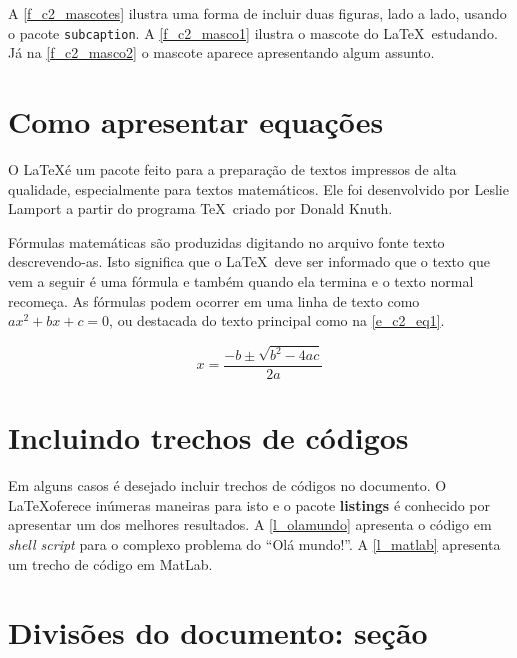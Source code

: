 A \autoref{f_c2_mascotes} ilustra uma forma de incluir duas figuras, lado a lado, usando o pacote \texttt{subcaption}. A \autoref{f_c2_masco1} ilustra o mascote do \LaTeX~estudando. Já na \autoref{f_c2_masco2} o mascote aparece apresentando algum assunto. 


\section{Como apresentar equações}
\label{s_c2_equacoes}

O \LaTeX é um pacote feito para a preparação de textos impressos de alta qualidade, especialmente
para textos matemáticos. Ele foi desenvolvido por Leslie Lamport a partir do programa
\TeX~criado por Donald Knuth.

Fórmulas matemáticas são produzidas digitando no arquivo fonte texto descrevendo-as. Isto
significa que o \LaTeX~deve ser informado que o texto que vem a seguir é uma fórmula e também
quando ela termina e o texto normal recomeça. As fórmulas podem ocorrer em uma linha de
texto como $ax^2 + bx + c = 0$, ou destacada do texto principal como na \autoref{e_c2_eq1}.

\begin{equation}
 x=\frac{-b\pm\sqrt{b^2-4ac}}{2a}
\label{e_c2_eq1}
\end{equation}

\section{Incluindo trechos de códigos}

Em alguns casos é desejado incluir trechos de códigos no documento. O \LaTeX oferece inúmeras maneiras para isto e o pacote \textbf{listings} é conhecido por apresentar um dos melhores resultados. A \autoref{l_olamundo} apresenta o código em \textit{shell script} para o complexo problema do ``Olá mundo!''. A \autoref{l_matlab} apresenta um trecho de código em MatLab.




\section{Divisões do documento: seção}\label{sec-divisoes}

